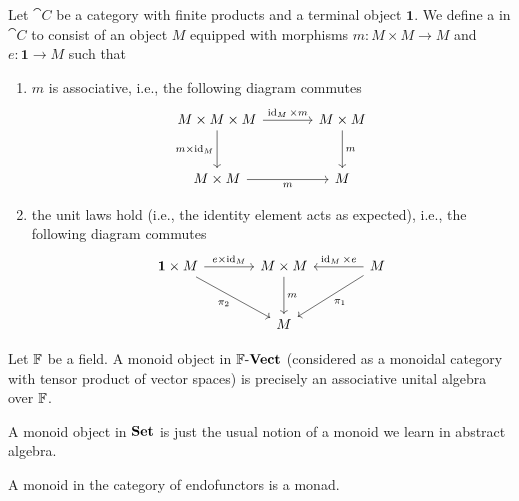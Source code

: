 
\begin{node}\label{internal-0007}%
\begin{definition}
Let $\cat{C}$ be a category with finite products and a terminal object
$\mathbf{1}$. We define a  in $\cat{C}$ to consist
of an object $M$ equipped with morphisms $m\colon M\times M\to M$
and $e\colon\mathbf{1}\to M$ such that
\begin{enumerate}
\item $m$ is associative, i.e., the following diagram commutes
\begin{equation*}
\begin{tikzcd}[sep=large]
M\times M\times M\ar[d,swap,"m\times\id_{M}"]\ar[r,"\id_{M}\times m"] & M\times M\ar[d,"m"]\\
M\times M\ar[r,swap,"m"] & M
\end{tikzcd}
\end{equation*}
\item the unit laws hold (i.e., the identity element acts as expected),
  i.e., the following diagram commutes
\begin{equation*}
\begin{tikzcd}[sep=large]
\mathbf{1}\times M\ar[dr,swap,"\pi_{2}"]\ar[r,"e\times\id_{M}"] &M\times M\ar[d,"m"] & \ar[l,swap,"\id_{M}\times e"]\ar[dl,"\pi_{1}"]M\\
& M &
\end{tikzcd}
\end{equation*}
\end{enumerate}
\end{definition}

\begin{node}[Examples]\label{internal-000J}%
\begin{node}\label{internal-000K}%
Let $\mathbb{F}$ be a field. A monoid object in $\mathbb{F}\textrm{-}\mathbf{Vect}$ (considered as a
monoidal category with tensor product of vector spaces) is precisely an
associative unital algebra over $\mathbb{F}$.
\end{node}

\begin{node}\label{internal-000L}%
A monoid object in $\mathbf{Set}$ is just the usual notion of a monoid we learn
in abstract algebra.
\end{node}

\begin{node}[Joke]\label{internal-000M}%
A monoid in the category of endofunctors is a monad.
\end{node}
\end{node}%


\end{node}
